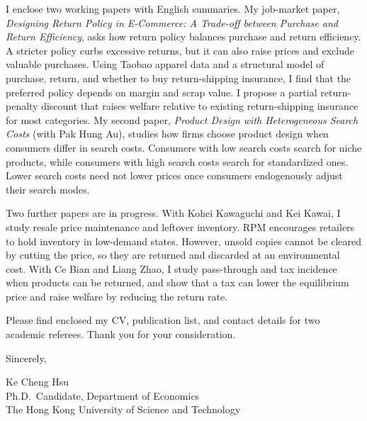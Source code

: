 \documentclass[11pt]{article}
\begin{document}
I enclose two working papers with English summaries. My job-market paper, \emph{Designing Return Policy in E-Commerce: A Trade-off between Purchase and Return Efficiency}, asks how return policy balances purchase and return efficiency. A stricter policy curbs excessive returns, but it can also raise prices and exclude valuable purchases. Using Taobao apparel data and a structural model of purchase, return, and whether to buy return-shipping insurance, I find that the preferred policy depends on margin and scrap value. I propose a partial return-penalty discount that raises welfare relative to existing return-shipping insurance for most categories. My second paper, \emph{Product Design with Heterogeneous Search Costs} (with Pak Hung Au), studies how firms choose product design when consumers differ in search costs. Consumers with low search costs search for niche products, while consumers with high search costs search for standardized ones. Lower search costs need not lower prices once consumers endogenously adjust their search modes.

Two further papers are in progress. With Kohei Kawaguchi and Kei Kawai, I study resale price maintenance and leftover inventory. RPM encourages retailers to hold inventory in low-demand states. However, unsold copies cannot be cleared by cutting the price, so they are returned and discarded at an environmental cost. With Ce Bian and Liang Zhao, I study pass-through and tax incidence when products can be returned, and show that a tax can lower the equilibrium price and raise welfare by reducing the return rate.

Please find enclosed my CV, publication list, and contact details for two academic referees. Thank you for your consideration.

\vspace{0.2em}
Sincerely,

\vspace{0.55em}
Ke Cheng Hsu \\
Ph.D.\ Candidate, Department of Economics \\
The Hong Kong University of Science and Technology
\end{document}
